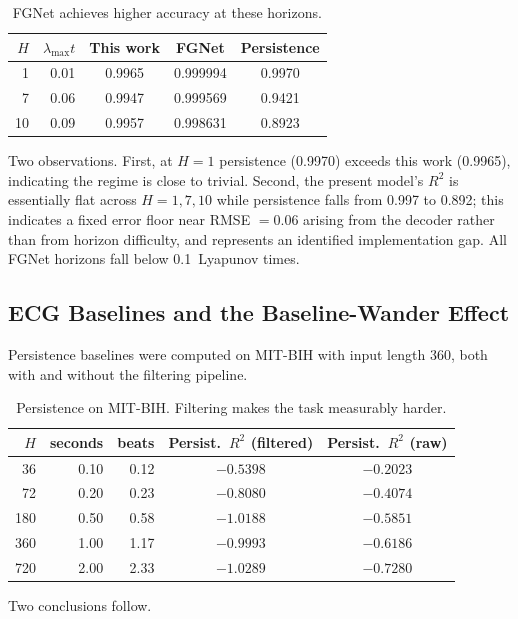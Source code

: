 \documentclass[11pt,a4paper]{article}
\begin{document}
\begin{table}[H]
\centering
\caption{FGNet achieves higher accuracy at these horizons.}
\begin{tabular}{rr|cc|c}
\toprule
$H$ & $\lambda_{\max} t$ & This work & FGNet & Persistence \\
\midrule
1  & 0.01 & 0.9965 & 0.999994 & 0.9970 \\
7  & 0.06 & 0.9947 & 0.999569 & 0.9421 \\
10 & 0.09 & 0.9957 & 0.998631 & 0.8923 \\
\bottomrule
\end{tabular}
\end{table}

Two observations.
First, at $H = 1$ persistence (0.9970) exceeds this work (0.9965), indicating the regime is close to trivial.
Second, the present model's $R^2$ is essentially flat across $H = 1, 7, 10$ while persistence falls from 0.997 to 0.892; this indicates a fixed error floor near RMSE $= 0.06$ arising from the decoder rather than from horizon difficulty, and represents an identified implementation gap.
All FGNet horizons fall below 0.1~Lyapunov times.


\subsection{ECG Baselines and the Baseline-Wander Effect}

Persistence baselines were computed on MIT-BIH with input length 360, both with and without the filtering pipeline.

\begin{table}[H]
\centering
\caption{Persistence on MIT-BIH. Filtering makes the task measurably harder.}
\begin{tabular}{rrrcc}
\toprule
$H$ & seconds & beats & Persist.\ $R^2$ (filtered) & Persist.\ $R^2$ (raw) \\
\midrule
36  & 0.10 & 0.12 & $-0.5398$ & $-0.2023$ \\
72  & 0.20 & 0.23 & $-0.8080$ & $-0.4074$ \\
180 & 0.50 & 0.58 & $-1.0188$ & $-0.5851$ \\
360 & 1.00 & 1.17 & $-0.9993$ & $-0.6186$ \\
720 & 2.00 & 2.33 & $-1.0289$ & $-0.7280$ \\
\bottomrule
\end{tabular}
\end{table}

Two conclusions follow.
\end{document}
